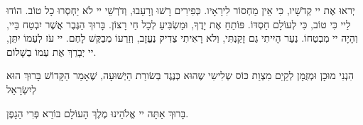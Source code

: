 יְראוּ אֶת יי קְדֹשָׁיו, כִּי אֵין מַחְסוֹר לִירֵאָיו. כְּפִירִים רָשׁוּ וְרָעֵבוּ, וְדֹרְשֵׁי יי לֹא יַחְסְרוּ כָל טוֹב. הוֹדוּ לַיי כִּי טוֹב, כִּי לְעוֹלָם חַסְדּוֹ. פּוֹתֵחַ אֶת יָדֶךָ, וּמַשְׂבִּיעַ לְכָל חַי רָצוֹן. בָּרוּךְ הַגֶּבֶר אֲשֶׁר יִבְטַח בַּיי, וְהָיָה יי מִבְטַחוֹ. נַעַר הָיִיתִי גַם זָקַנְתִּי, וְלֹא רָאִיתִי צַדִיק נֶעֱזָב, וְזַרְעוֹ מְבַקֶּשׁ לָחֶם. יי עֹז לְעַמוֹ יִתֵּן, יי יְבָרֵךְ אֶת עַמוֹ בַשָׁלוֹם.

\vspace{1em}


הִנְנִי מוּכָן וּמְזֻמָּן לְקַיֵם מִצְוַת כּוֹס שְלִישִי שֶהוּא כְּנֶגֶד בְּשׂורַת הַיְשׁוּעָה, שֶׁאָמַר הַקָּדוֹשׁ בָּרוּךְ הוּא לְיִשְׂרָאֵל 

בָּרוּךְ אַתָּה יי אֱלֹהֵינוּ מֶלֶךְ הָעוֹלָם בּוֹרֵא פְּרִי הַגָפֶן.
\vspace{1em}

